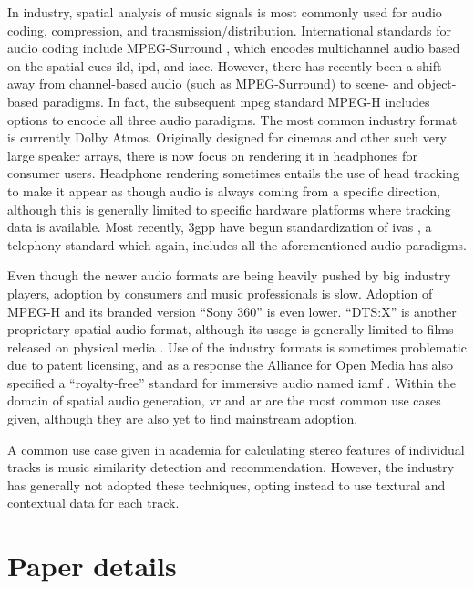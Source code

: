 \documentclass[a4paper]{article}
\begin{document}
In industry, spatial analysis of music signals is most commonly used for audio coding, compression, and transmission/distribution. International standards for audio coding include MPEG-Surround \cite{iso/iec23003-1InformationTechnologyMPEG2007}, which encodes multichannel audio based on the spatial cues \gls{ild}, \gls{ipd}, and \gls{iacc}. However, there has recently been a shift away from channel-based audio (such as MPEG-Surround) to scene- and object-based paradigms. In fact, the subsequent \gls{mpeg} standard MPEG-H \cite{mpeg-h} includes options to encode all three audio paradigms. The most common industry format is currently Dolby Atmos\texttrademark. Originally designed for cinemas and other such very large speaker arrays, there is now focus on rendering it in headphones for consumer users. Headphone rendering sometimes entails the use of head tracking to make it appear as though audio is always coming from a specific direction, although this is generally limited to specific hardware platforms where tracking data is available. Most recently, \gls{3gpp} have begun standardization of \gls{ivas} \cite{IVASCodecNG}, a telephony standard which again, includes all the aforementioned audio paradigms.

Even though the newer audio formats are being heavily pushed by big industry players, adoption by consumers and music professionals is slow.  Adoption of MPEG-H and its branded version \enquote{Sony 360} is even lower. \enquote{DTS:X} is another proprietary spatial audio format, although its usage is generally limited to films released on physical media \cite{publishedDTSWhatIt2021}. Use of the industry formats is sometimes problematic due to patent licensing, and as a response the Alliance for Open Media has also specified a \enquote{royalty-free} standard for immersive audio named \gls{iamf} \cite{ImmersiveAudioModel}. Within the domain of spatial audio generation, \gls{vr} and \gls{ar} are the most common use cases given, although they are also yet to find mainstream adoption.

A common use case given in academia for calculating stereo features of individual tracks is music similarity detection and recommendation. However, the industry has generally not adopted these techniques, opting instead to use textural and contextual data for each track.


\section{Paper details}
\label{sec:paper_details}
\end{document}
